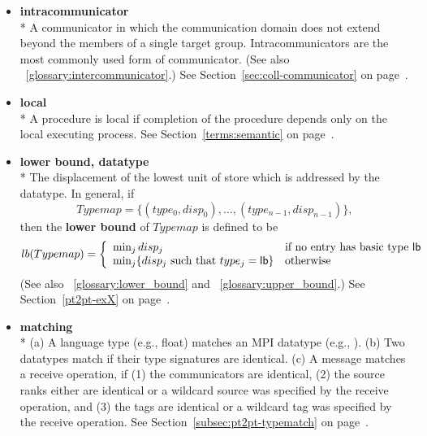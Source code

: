 \begin{itemize}
\label{glossary:intracommunicator}
\item \textbf{ intracommunicator} \\*
A communicator in which the communication domain does not extend beyond the members of a single target group. 
Intracommunicators are the most commonly used form of communicator.
(See also ~\ref{glossary:intercommunicator}.)
See Section~\ref{sec:coll-communicator} on page~\pageref{sec:coll-communicator}.

\label{glossary:local}
\item \textbf{ local} \\*
A procedure is local if completion of the procedure depends only on the
local executing process.
See Section~\ref{terms:semantic} on page~\pageref{terms:semantic}.

\label{glossary:lower_bound_datatype}
\item \textbf{ lower bound, datatype} \\*
The displacement of the lowest unit of store which is addressed by the datatype. 
In general, if
\begin{displaymath}
Typemap = \{ (type_0 , disp_0 ) , ... , (type_{n-1} , disp_{n-1}) \} ,
\end{displaymath}
then the {\bf lower bound} of $Typemap$ is defined to be
\[
lb(Typemap) = \left\{ \begin{array}{ll}
\min_j disp_j & \mbox{if no entry has basic type {\sf lb}} \\
\min_j \{ disp_j \ \mbox{such that}\ type_j = {\sf lb} \} & \mbox{otherwise}
\end{array}
\right. \]
(See also ~\ref{glossary:lower_bound} and ~\ref{glossary:upper_bound}.)
See Section~\ref{pt2pt-exX} on page~\pageref{pt2pt-exX}.

\label{glossary:matching}
\item \textbf{ matching} \\*
(a) A language type (e.g., float) matches an MPI datatype (e.g., ). 
(b) Two datatypes match if their type signatures are identical.
(c) A message matches a receive operation, if (1) the communicators are identical, (2) the source ranks either are identical or a wildcard source was specified by the receive operation, and (3) the tags are identical or a wildcard tag was specified by the receive operation.
 See Section~\ref{subsec:pt2pt-typematch} on page~\pageref{subsec:pt2pt-typematch}.


\end{itemize}
